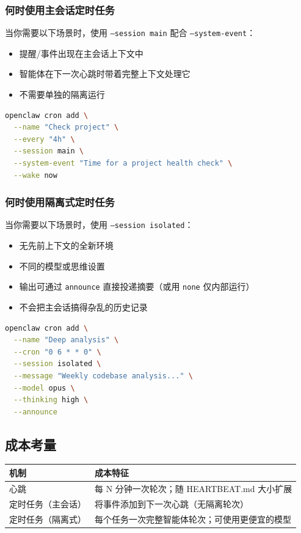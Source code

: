 \subsubsection{何时使用主会话定时任务}


当你需要以下场景时，使用 \texttt{--session main} 配合 \texttt{--system-event}：

\begin{itemize}
  \item 提醒/事件出现在主会话上下文中
  \item 智能体在下一次心跳时带着完整上下文处理它
  \item 不需要单独的隔离运行
\end{itemize}


\begin{lstlisting}[language=bash]
openclaw cron add \
  --name "Check project" \
  --every "4h" \
  --session main \
  --system-event "Time for a project health check" \
  --wake now
\end{lstlisting}


\subsubsection{何时使用隔离式定时任务}


当你需要以下场景时，使用 \texttt{--session isolated}：

\begin{itemize}
  \item 无先前上下文的全新环境
  \item 不同的模型或思维设置
  \item 输出可通过 \texttt{announce} 直接投递摘要（或用 \texttt{none} 仅内部运行）
  \item 不会把主会话搞得杂乱的历史记录
\end{itemize}


\begin{lstlisting}[language=bash]
openclaw cron add \
  --name "Deep analysis" \
  --cron "0 6 * * 0" \
  --session isolated \
  --message "Weekly codebase analysis..." \
  --model opus \
  --thinking high \
  --announce
\end{lstlisting}


\subsection{成本考量}



\begin{table}[h]
\centering
\small
\begin{tabular}{|l|l|}
\hline
机制 & 成本特征 \\
\hline
心跳 & 每 N 分钟一次轮次；随 HEARTBEAT.md 大小扩展 \\
\hline
定时任务（主会话） & 将事件添加到下一次心跳（无隔离轮次） \\
\hline
定时任务（隔离式） & 每个任务一次完整智能体轮次；可使用更便宜的模型 \\
\hline
\end{tabular}
\end{table}



